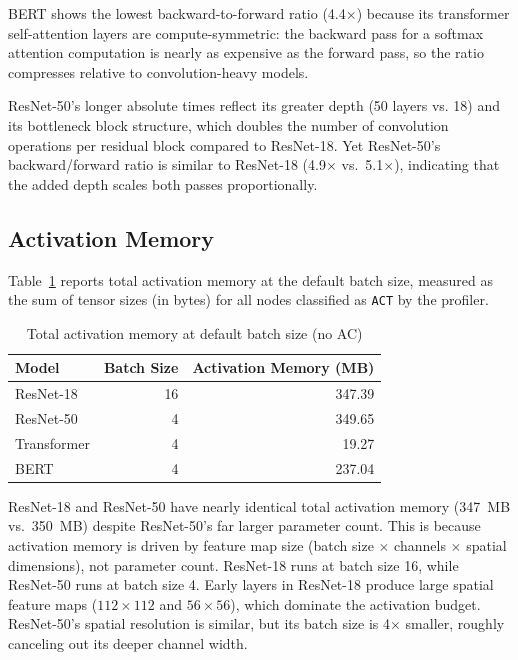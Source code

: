 \documentclass[11pt]{article}
\begin{document}
BERT shows the lowest backward-to-forward ratio (4.4$\times$) because its
transformer self-attention layers are compute-symmetric: the backward pass
for a softmax attention computation is nearly as expensive as the forward
pass, so the ratio compresses relative to convolution-heavy models.

ResNet-50's longer absolute times reflect its greater depth (50 layers vs.
18) and its bottleneck block structure, which doubles the number of
convolution operations per residual block compared to ResNet-18. Yet
ResNet-50's backward/forward ratio is similar to ResNet-18 (4.9$\times$
vs.\ 5.1$\times$), indicating that the added depth scales both passes
proportionally.

\subsection{Activation Memory}

Table~\ref{tab:actmem} reports total activation memory at the default
batch size, measured as the sum of tensor sizes (in bytes) for all nodes
classified as \texttt{ACT} by the profiler.

\begin{table}[H]
\centering
\caption{Total activation memory at default batch size (no AC)}
\label{tab:actmem}
\begin{tabular}{lrr}
\toprule
\textbf{Model} & \textbf{Batch Size} & \textbf{Activation Memory (MB)} \\
\midrule
ResNet-18   & 16 & 347.39 \\
ResNet-50   &  4 & 349.65 \\
Transformer &  4 &  19.27 \\
BERT        &  4 & 237.04 \\
\bottomrule
\end{tabular}
\end{table}

ResNet-18 and ResNet-50 have nearly identical total activation memory
(347~MB vs.\ 350~MB) despite ResNet-50's far larger parameter count. This
is because activation memory is driven by feature map size (batch size
$\times$ channels $\times$ spatial dimensions), not parameter count.
ResNet-18 runs at batch size 16, while ResNet-50 runs at batch size 4.
Early layers in ResNet-18 produce large spatial feature maps
($112\times112$ and $56\times56$), which dominate the activation budget.
ResNet-50's spatial resolution is similar, but its batch size is 4$\times$
smaller, roughly canceling out its deeper channel width.
\end{document}
